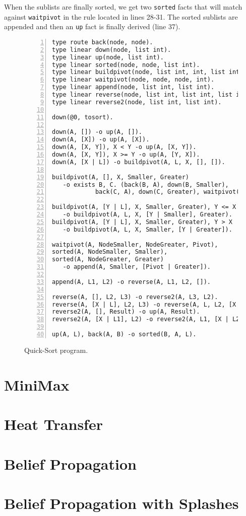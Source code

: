 When the sublists are finally sorted, we get two \texttt{sorted} facts that will match
against \texttt{waitpivot} in the rule located in lines 28-31. The sorted sublists
are appended and then an \texttt{up} fact is finally derived (line 37).

\begin{figure}[h!]
\small\begin{Verbatim}[numbers=left]
type route back(node, node).
type linear down(node, list int).
type linear up(node, list int).
type linear sorted(node, node, list int).
type linear buildpivot(node, list int, int, list int, list int).
type linear waitpivot(node, node, node, int).
type linear append(node, list int, list int).
type linear reverse(node, list int, list int, list int).
type linear reverse2(node, list int, list int).

down(@0, tosort).

down(A, []) -o up(A, []).
down(A, [X]) -o up(A, [X]).
down(A, [X, Y]), X < Y -o up(A, [X, Y]).
down(A, [X, Y]), X >= Y -o up(A, [Y, X]).
down(A, [X | L]) -o buildpivot(A, L, X, [], []).

buildpivot(A, [], X, Smaller, Greater)
   -o exists B, C. (back(B, A), down(B, Smaller),
            back(C, A), down(C, Greater), waitpivot(A, B, C, X)).

buildpivot(A, [Y | L], X, Smaller, Greater), Y <= X
   -o buildpivot(A, L, X, [Y | Smaller], Greater).
buildpivot(A, [Y | L], X, Smaller, Greater), Y > X
   -o buildpivot(A, L, X, Smaller, [Y | Greater]).
   
waitpivot(A, NodeSmaller, NodeGreater, Pivot),
sorted(A, NodeSmaller, Smaller),
sorted(A, NodeGreater, Greater)
   -o append(A, Smaller, [Pivot | Greater]).

append(A, L1, L2) -o reverse(A, L1, L2, []).

reverse(A, [], L2, L3) -o reverse2(A, L3, L2).
reverse(A, [X | L], L2, L3) -o reverse(A, L, L2, [X | L3]).
reverse2(A, [], Result) -o up(A, Result).
reverse2(A, [X | L1], L2) -o reverse2(A, L1, [X | L2]).

up(A, L), back(A, B) -o sorted(B, A, L).
\end{Verbatim}
  \caption{Quick-Sort program.}
  \label{code:quicksort}
\end{figure}
\normalsize


\section{MiniMax}

\section{Heat Transfer}

\section{Belief Propagation}

\section{Belief Propagation with Splashes}
